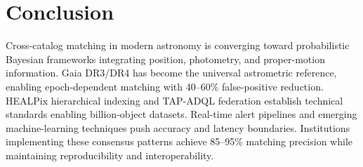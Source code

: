 \documentclass[11pt,twocolumn]{article}
\begin{document}
\section{Conclusion}

Cross-catalog matching in modern astronomy is converging toward probabilistic Bayesian frameworks integrating position, photometry, and proper-motion information. Gaia DR3/DR4 has become the universal astrometric reference, enabling epoch-dependent matching with 40--60\% false-positive reduction. HEALPix hierarchical indexing and TAP-ADQL federation establish technical standards enabling billion-object datasets. Real-time alert pipelines and emerging machine-learning techniques push accuracy and latency boundaries. Institutions implementing these consensus patterns achieve 85--95\% matching precision while maintaining reproducibility and interoperability.



\end{document}
